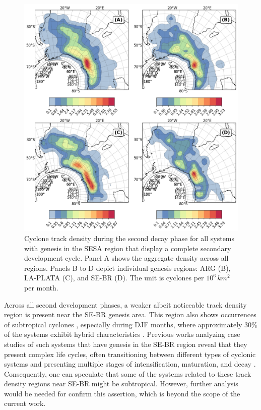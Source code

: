 \begin{figure}[!htbp]
\centering
\includegraphics[width=\textwidth]{figs_4/density_map_decay 2_regions_secondary.png}
\caption[Track Density - Decay 2]{Cyclone track density during the second decay phase for all systems with genesis in the SESA region that display a complete secondary development cycle. Panel A shows the aggregate density across all regions. Panels B to D depict individual genesis regions: ARG (B), LA-PLATA (C), and SE-BR (D). The unit is cyclones per \(10^6 \, km^2\) per month.}
\label{fig:decay_2}
\end{figure}

Across all second development phases, a weaker albeit noticeable track density region is present near the SE-BR genesis area. This region also shows occurrences of subtropical cyclones \cite{evans2012climatology, de2022future, cardoso2022synoptic}, especially during DJF months, where approximately 30\% of the systems exhibit hybrid characteristics \cite{gozzo2014subtropical}. Previous works analyzing case studies of such systems that have genesis in the SE-BR region reveal that they present complex life cycles, often transitioning between different types of cyclonic systems and presenting multiple stages of intensification, maturation, and decay \citep[e.g.,]{dias2013synoptic, veiga2008analysis, reboita2022shapiro, dutra2017structure, reboita2021iba}. Consequently, one can speculate that some of the systems related to these track density regions near SE-BR might be subtropical. However, further analysis would be needed for confirm this assertion, which is beyond the scope of the current work.


